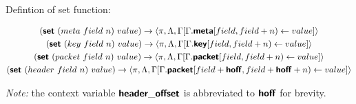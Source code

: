 Defintion of set function:
\begin{mdframed}
\begin{gather*}
  (\bm{\mathsf{{set}}} \ (meta \ field \ n) \ value)
  \rightarrow
  \langle \pi, \Lambda, \Gamma[\Gamma.\bm{\mathsf{{meta}}}[field, field + n) \leftarrow value] \rangle
  \\
  (\bm{\mathsf{{set}}} \ (key \ field \ n) \ value)
  \rightarrow
  \langle \pi, \Lambda, \Gamma[\Gamma.\bm{\mathsf{{key}}}[field, field + n) \leftarrow value] \rangle
  \\
  (\bm{\mathsf{{set}}} \ (packet \ field \ n) \ value)
  \rightarrow
  \langle \pi, \Lambda, \Gamma[\Gamma.\bm{\mathsf{{packet}}}[field, field + n) \leftarrow value] \rangle
  \\
  (\bm{\mathsf{{set}}} \ (header \ field \ n) \ value)
  \rightarrow
  \langle \pi, \Lambda, \Gamma[\Gamma.\bm{\mathsf{{packet}}}[field + \bm{\mathsf{{hoff}}},
      field + \bm{\mathsf{{hoff}}} + n) \leftarrow value] \rangle
  \\
\end{gather*}
\end{mdframed}
\textit{Note:} the context variable $\bm{\mathsf{{header\_offset}}}$ is abbreviated to $\bm{\mathsf{{hoff}}}$ for brevity.
